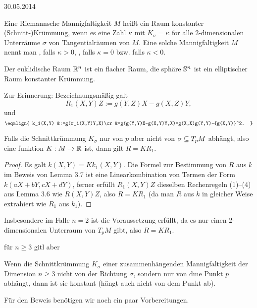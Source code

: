 \documentclass{article}
\begin{document}
\hfill{30.05.2014}

\begin{definition} Eine Riemannsche Mannigfaltigkeit $M$ heißt ein Raum konstanter (Schnitt-)Krümmung, wenn es eine Zahl $\kappa$ mit $K_{\sigma}=\kappa$ for alle $2$-dimensionalen Unterräume $\sigma$ von Tangentialräumen von $M$. Eine solche Mannigfaltigkeit $M$ nennt man , falls $\kappa>0$, , falls $\kappa=0$ bzw.  falls $\kappa<0$. 
\end{definition}%

\begin{example}
    Der euklidische Raum $\mathbb{R}^n$ ist ein flacher Raum, die sphäre $\mathbb{S}^n$ ist ein elliptischer Raum konstanter Krümmung.
\end{example}

Zur Erinnerung:
Bezeichnungsmäßig galt $$
R_1(X,Y)Z:=g(Y,Z)X-g(X,Z)Y,
$$
und
$$
\eqalign{
    k_1(X,Y)
    &:=g(r_1(X,Y)Y,X)\cr
    &=g(g(Y,Y)X-g(X,Y)Y,X)=g(X,X)g(Y,Y)-{g(X,Y)}^2.
}
$$

\begin{fact}\label{f39}
    Falls die Schnittkrümmung $K_{\sigma}$ nur von $p$ aber nicht von $\sigma\subseteq T_p M$ abhängt, also eine funktion $K:M\rightarrow\mathbb{R}$ ist, dann gilt $R=K R_1$.
\end{fact}

\begin{proof}
    Es galt $k(X,Y)=K k_1(X,Y)$. Die Formel zur Bestimmung von $R$ aus $k$ im Beweis von Lemma 3.7 ist eine Linearkombination von Termen der Form $k(aX+bY, cX+dY)$, ferner erfüllt $R_1(X,Y)Z$ dieselben Rechenregeln (1)--(4) aus Lemma 3.6 wie $R(X,Y)Z$, also $R=K R_1$ (da man $R$ aus $k$ in gleicher Weise extrahiert wie $R_1$ aus $k_1$).
\end{proof}

Insbesondere im Falle $n=2$ ist die Voraussetzung erfüllt, da es nur einen $2$-dimensionalen Unterraum von $T_p M$ gibt, also $R = K R_1$.

für $n\geq 3$ gitl aber

\begin{theorem}\label{thmschur} Wenn die Schnittkrümmung $K_\sigma$ einer zusammenhängenden Mannigfaltigkeit der Dimension $n\geq 3$ nicht von der Richtung $\sigma$, sondern nur von dme Punkt $p$ abhängt, dann ist sie konstant (hängt auch nicht von dem Punkt ab).
\end{theorem}

Für den Beweis benötigen wir noch ein paar Vorbereitungen.
\end{document}
